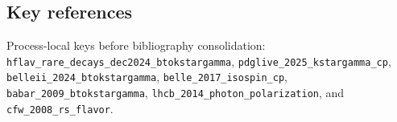 \subsection*{Key references}
Process-local keys before bibliography consolidation:
\texttt{hflav\_rare\_decays\_dec2024\_btokstargamma},
\texttt{pdglive\_2025\_kstargamma\_cp},
\texttt{belleii\_2024\_btokstargamma},
\texttt{belle\_2017\_isospin\_cp},
\texttt{babar\_2009\_btokstargamma},
\texttt{lhcb\_2014\_photon\_polarization}, and
\texttt{cfw\_2008\_rs\_flavor}.
